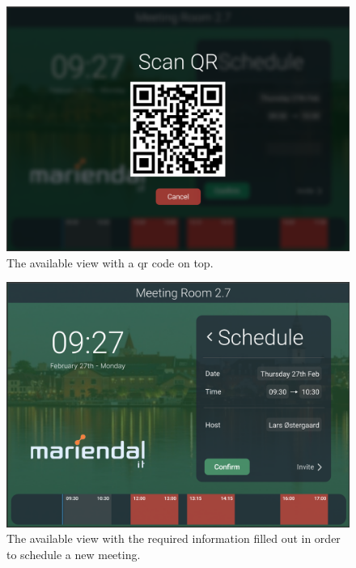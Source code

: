   \begin{figure}[h!]
    \centering
    \includegraphics[width=1\textwidth]{images/available_qr.png}
    \caption{The available view with a qr code on top.}
    \label{fig:available_qr}
  \end{figure}

  \begin{figure}[h!]
    \centering
    \includegraphics[width=1\textwidth]{images/available_host}
    \caption{The available view with the required information filled out in order to schedule a new meeting.}
    \label{fig:available_host}
  \end{figure}

